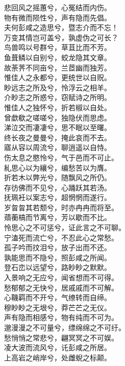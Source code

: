 \documentclass[]{article}
\begin{document}
悲回风之摇蕙兮，心冤结而内伤。\\
物有微而陨性兮，声有隐而先倡。\\
夫何彭咸之造思兮，暨志介而不忘！\\
万变其情岂可盖兮，孰虚伪之可长？\\
鸟兽鸣以号群兮，草苴比而不芳。\\
鱼葺鳞以自别兮，蛟龙隐其文章。\\
故荼荠不同亩兮，兰茝幽而独芳。\\
惟佳人之永都兮，更统世以自贶。\\
眇远志之所及兮，怜浮云之相羊。\\
介眇志之所惑兮，窃赋诗之所明。\\
惟佳人之独怀兮，折若椒以自处。\\
曾歔欷之嗟嗟兮，独隐伏而思虑。\\
涕泣交而凄凄兮，思不眠以至曙。\\
终长夜之曼曼兮，掩此哀而不去。\\
寤从容以周流兮，聊逍遥以自恃。\\
伤太息之愍怜兮，气于邑而不可止。\\
糺思心以为纕兮，编愁苦以为膺。\\
折若木以弊光兮，随飘风之所仍。\\
存彷佛而不见兮，心踊跃其若汤。\\
抚珮衽以案志兮，超惘惘而遂行。\\
岁曶曶其若颓兮，时亦冉冉而将至。\\
薠蘅槁而节离兮，芳以歇而不比。\\
怜思心之不可惩兮，证此言之不可聊。\\
宁溘死而流亡兮，不忍此心之常愁。\\
孤子吟而抆泪兮，放子出而不还。\\
孰能思而不隐兮，照彭咸之所闻。\\
登石峦以远望兮，路眇眇之默默。\\
入景响之无应兮，闻省想而不可得。\\
愁郁郁之无快兮，居戚戚而不可解。\\
心鞿羁而不开兮，气缭转而自缔。\\
穆眇眇之无垠兮，莽芒芒之无仪。\\
声有隐而相感兮，物有纯而不可为。\\
邈漫漫之不可量兮，缥绵绵之不可纡。\\
愁悄悄之常悲兮，翩冥冥之不可娱。\\
凌大波而流风兮，讬彭咸之所居。\\
上高岩之峭岸兮，处雌蜺之标颠。\\
\end{document}
